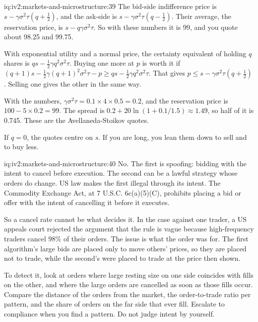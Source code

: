 \begin{solution}{iq:iv2:markets-and-microstructure:39}
The bid-side indifference price is $s - \gamma\sigma^2\tau(q + \tfrac12)$, and the ask-side is $s - \gamma\sigma^2\tau(q - \tfrac12)$. Their average, the reservation price, is $s - q\gamma\sigma^2\tau$. So with these numbers it is 99, and you quote about 98.25 and 99.75.

With exponential utility and a normal price, the certainty equivalent of holding $q$ shares is $qs - \tfrac12\gamma q^2\sigma^2\tau$. Buying one more at $p$ is worth it if $(q + 1)s - \tfrac12\gamma(q + 1)^2\sigma^2\tau - p \geq qs - \tfrac12\gamma q^2\sigma^2\tau$. That gives $p \leq s - \gamma\sigma^2\tau(q + \tfrac12)$. Selling one gives the other in the same way.

With the numbers, $\gamma\sigma^2\tau = 0.1 \times 4 \times 0.5 = 0.2$, and the reservation price is $100 - 5 \times 0.2 = 99$. The spread is $0.2 + 20\ln(1 + 0.1/1.5) \approx 1.49$, so half of it is 0.745. These are the Avellaneda-Stoikov quotes.

If $q = 0$, the quotes centre on $s$. If you are long, you lean them down to sell and to buy less.

\end{solution}

\begin{solution}{iq:iv2:markets-and-microstructure:40}
No. The first is spoofing: bidding with the intent to cancel before execution. The second can be a lawful strategy whose orders do change. US law makes the first illegal through its intent. The Commodity Exchange Act, at 7 U.S.C. 6c(a)(5)(C), prohibits placing a bid or offer with the intent of cancelling it before it executes.

So a cancel rate cannot be what decides it. In the case against one trader, a US appeals court rejected the argument that the rule is vague because high-frequency traders cancel 98\% of their orders. The issue is what the order was for. The first algorithm's large bids are placed only to move others' prices, so they are placed not to trade, while the second's were placed to trade at the price then shown.

To detect it, look at orders where large resting size on one side coincides with fills on the other, and where the large orders are cancelled as soon as those fills occur. Compare the distance of the orders from the market, the order-to-trade ratio per pattern, and the share of orders on the far side that ever fill. Escalate to compliance when you find a pattern. Do not judge intent by yourself.

\end{solution}

